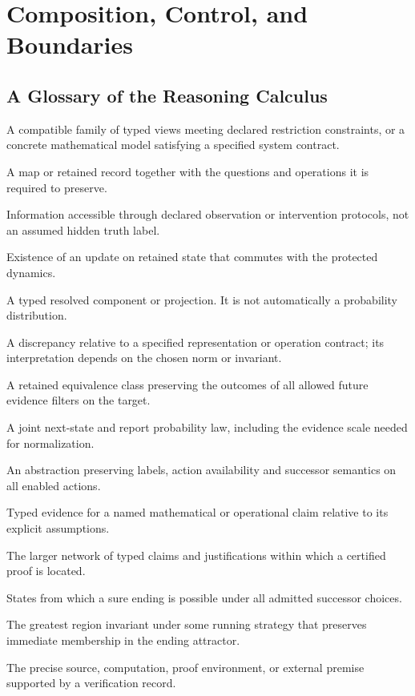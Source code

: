 \documentclass[11pt,oneside,openany]{book}
\theoremstyle{definition}\newtheorem{definition}[theorem]{Definition}
\begin{document}
\part{Composition, Control, and Boundaries}



\backmatter
\chapter{A Glossary of the Reasoning Calculus}
\begin{description}[style=nextline]
\item[Realization] A compatible family of typed views meeting declared restriction constraints, or a concrete mathematical model satisfying a specified system contract.
\item[Representation] A map or retained record together with the questions and operations it is required to preserve.
\item[Evidence] Information accessible through declared observation or intervention protocols, not an assumed hidden truth label.
\item[Predictive closure] Existence of an update on retained state that commutes with the protected dynamics.
\item[Packet] A typed resolved component or projection. It is not automatically a probability distribution.
\item[Residual] A discrepancy relative to a specified representation or operation contract; its interpretation depends on the chosen norm or invariant.
\item[Correction signature] A retained equivalence class preserving the outcomes of all allowed future evidence filters on the target.
\item[Instrument] A joint next-state and report probability law, including the evidence scale needed for normalization.
\item[Legal-operation quotient] An abstraction preserving labels, action availability and successor semantics on all enabled actions.
\item[Certificate] Typed evidence for a named mathematical or operational claim relative to its explicit assumptions.
\item[Proof field] The larger network of typed claims and justifications within which a certified proof is located.
\item[Ending attractor] States from which a sure ending is possible under all admitted successor choices.
\item[Running kernel] The greatest region invariant under some running strategy that preserves immediate membership in the ending attractor.
\item[Assurance boundary] The precise source, computation, proof environment, or external premise supported by a verification record.
\end{description}

\end{document}
